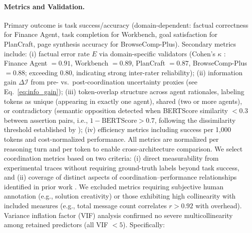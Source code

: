 \paragraph{Metrics and Validation.}
Primary outcome is task success/accuracy (domain-dependent: factual correctness for Finance Agent, task completion for Workbench, goal satisfaction for PlanCraft, page synthesis accuracy for BrowseComp-Plus). Secondary metrics include: (i) factual error rate $E$ via domain-specific validators (Cohen's $\kappa$ \citep{cohen1960coefficient}: Finance Agent $= 0.91$, Workbench $= 0.89$, PlanCraft $= 0.87$, BrowseComp-Plus $= 0.88$; exceeding 0.80, indicating strong inter-rater reliability); (ii) information gain $\Delta \mathcal{I}$ from pre- vs.\ post-coordination uncertainty proxies (see Eq.~\ref{eq:info_gain}); (iii) token-overlap structure across agent rationales, labeling tokens as unique (appearing in exactly one agent), shared (two or more agents), or contradictory (semantic opposition detected when BERTScore similarity $< 0.3$ between assertion pairs, i.e., $1 - \text{BERTScore} > 0.7$, following the dissimilarity threshold established by \citet{zhang2019bertscore}); (iv) efficiency metrics including success per 1,000 tokens and cost-normalized performance. All metrics are normalized per reasoning turn and per token to enable cross-architecture comparison. We select coordination metrics based on two criteria: (i) direct measurability from experimental traces without requiring ground-truth labels beyond task success, and (ii) coverage of distinct aspects of coordination--performance relationships identified in prior work \citep{cemri2025multi}. We excluded metrics requiring subjective human annotation (e.g., solution creativity) or those exhibiting high collinearity with included measures (e.g., total message count correlates $r > 0.92$ with overhead). Variance inflation factor (VIF) analysis confirmed no severe multicollinearity among retained predictors (all VIF $< 5$). Specifically:


